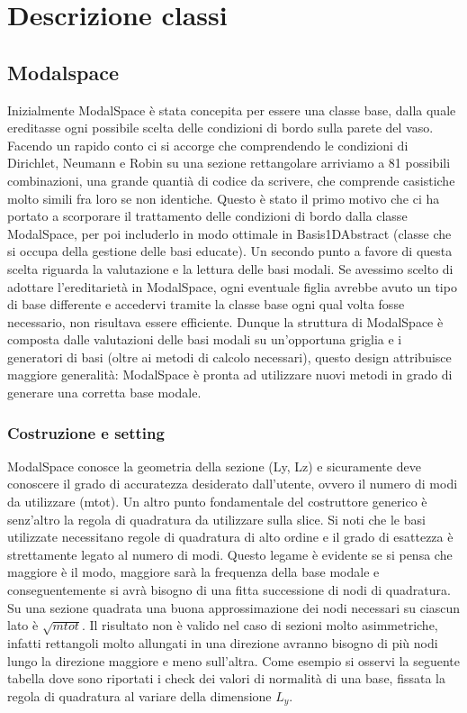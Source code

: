 \chapter{Descrizione classi}
\section{Modalspace}

Inizialmente ModalSpace \`e stata concepita per essere una classe base, dalla quale ereditasse ogni possibile scelta delle condizioni di bordo sulla parete del vaso. Facendo un rapido conto ci si accorge che comprendendo le condizioni di Dirichlet, Neumann e Robin su una sezione rettangolare arriviamo a 81 possibili combinazioni, una grande quanti\`a di codice da scrivere, che comprende casistiche molto simili fra loro se non identiche. Questo \`e stato il primo motivo che ci ha portato a scorporare il trattamento delle condizioni di bordo dalla classe ModalSpace, per poi includerlo in modo ottimale in Basis1DAbstract (classe che si occupa della gestione delle basi educate). Un secondo punto a favore di questa scelta riguarda la valutazione e la lettura delle basi modali. Se avessimo scelto di adottare l'ereditariet\`a in ModalSpace, ogni eventuale figlia avrebbe avuto un tipo di base differente e accedervi tramite la classe base ogni qual volta fosse necessario, non risultava essere efficiente. Dunque la struttura di ModalSpace \`e composta dalle valutazioni delle basi modali su un'opportuna griglia e i generatori di basi (oltre ai metodi di calcolo necessari), questo design attribuisce maggiore generalit\`a: ModalSpace \`e pronta ad utilizzare nuovi metodi in grado di generare una corretta base modale.

\subsection{Costruzione e setting}
ModalSpace conosce la geometria della sezione (Ly, Lz) e sicuramente deve conoscere il grado di accuratezza desiderato dall'utente, ovvero il numero di modi da utilizzare (mtot). 
Un altro punto fondamentale del costruttore generico \`e senz'altro la regola di quadratura da utilizzare sulla slice. Si noti che le basi utilizzate necessitano regole di quadratura di alto ordine e il grado di esattezza \`e strettamente legato al numero di modi. Questo legame \`e evidente se si pensa che maggiore \`e il modo, maggiore sar\`a la frequenza della base modale e conseguentemente si avr\`a bisogno di una fitta successione di nodi di quadratura. Su una sezione quadrata una buona approssimazione dei nodi necessari su ciascun lato \`e $\sqrt{mtot}$. Il risultato non \`e valido nel caso di sezioni molto asimmetriche, infatti rettangoli molto allungati in una direzione avranno bisogno di pi\`u nodi lungo la direzione maggiore e meno sull'altra. Come esempio si osservi la seguente tabella dove sono riportati i check dei valori di normalit\`a di una base, fissata la regola di quadratura al variare della dimensione $L_y$.

